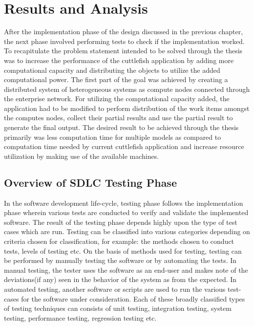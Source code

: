 \chapter{Results and Analysis}

After the implementation phase of the design discussed in the previous chapter, the next phase involved performing tests to check if the implementation worked. To recapitulate the problem statement intended to be solved through the thesis was to increase the performance of the cuttlefish application by adding more computational capacity and distributing the objects to utilize the added computational power. The first part of the goal was achieved by creating a distributed system of heterogeneous systems as compute nodes connected through the enterprise network. For utilizing the computational capacity added, the application had to be modified to perform distribution of the work items amongst the computes nodes, collect their partial results and use the partial result to generate the final output. The desired result to be achieved through the thesis primarily was less computation time for multiple models as compared to computation time needed by current cuttlefish application and increase resource utilization by making use of the available machines.\newline

\section{Overview of SDLC Testing Phase} \label{SDLCTesting}

In the software development life-cycle, testing phase follows the implementation phase wherein various tests are conducted to verify and validate the implemented software. The result of the testing phase depends highly upon the type of test cases which are run. Testing can be classified into various categories depending on criteria chosen for classification, for example: the methods chosen to conduct tests, levels of testing etc. On the basis of methods used for testing, testing can be performed by manually testing the software or by automating the tests. In manual testing, the tester uses the software as an end-user and makes note of the deviations(if any) seen in the behavior of the system as from the expected. In automated testing, another software or scripts are used to run the various test-cases for the software under consideration. Each of these broadly classified types of testing techniques can consists of unit testing, integration testing, system testing, performance testing, regression testing etc.\newline

